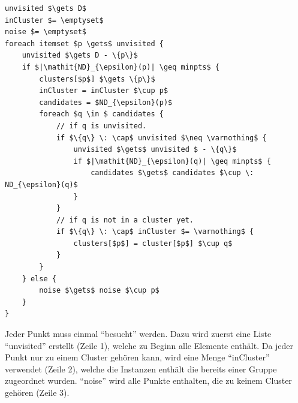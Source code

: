 
\begin{lstlisting}
unvisited $\gets D$
inCluster $= \emptyset$
noise $= \emptyset$
foreach itemset $p \gets$ unvisited {
	unvisited $\gets D - \{p\}$
	if $|\mathit{ND}_{\epsilon}(p)| \geq minpts$ {
		clusters[$p$] $\gets \{p\}$
		inCluster = inCluster $\cup p$
		candidates = $ND_{\epsilon}(p)$
		foreach $q \in $ candidates {
			// if q is unvisited.
			if $\{q\} \: \cap$ unvisited $\neq \varnothing$ {
				unvisited $\gets$ unvisited $ - \{q\}$
				if $|\mathit{ND}_{\epsilon}(q)| \geq minpts$ {
					candidates $\gets$ candidates $\cup \: ND_{\epsilon}(q)$
				}
			}
			// if q is not in a cluster yet.
			if $\{q\} \: \cap$ inCluster $= \varnothing$ {
				clusters[$p$] = cluster[$p$] $\cup q$
			}
		}
	} else {
		noise $\gets$ noise $\cup p$
	}
}
\end{lstlisting}
Jeder Punkt muss einmal "`besucht"' werden. Dazu wird zuerst eine Liste "`unvisited"' erstellt (Zeile 1), welche zu Beginn alle Elemente enthält. Da jeder Punkt nur zu einem Cluster gehören kann, wird eine Menge "`inCluster"' verwendet (Zeile 2), welche die Instanzen enthält die bereits einer Gruppe zugeordnet wurden. "`noise"' wird alle Punkte enthalten, die zu keinem Cluster gehören (Zeile 3).

